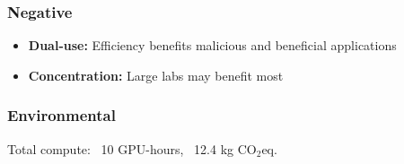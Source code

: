 \subsubsection{Negative}
\begin{itemize}
\item \textbf{Dual-use:} Efficiency benefits malicious and beneficial applications
\item \textbf{Concentration:} Large labs may benefit most

\end{itemize}
\subsubsection{Environmental}
Total compute: ~10 GPU-hours, ~12.4 kg CO$_2$eq.